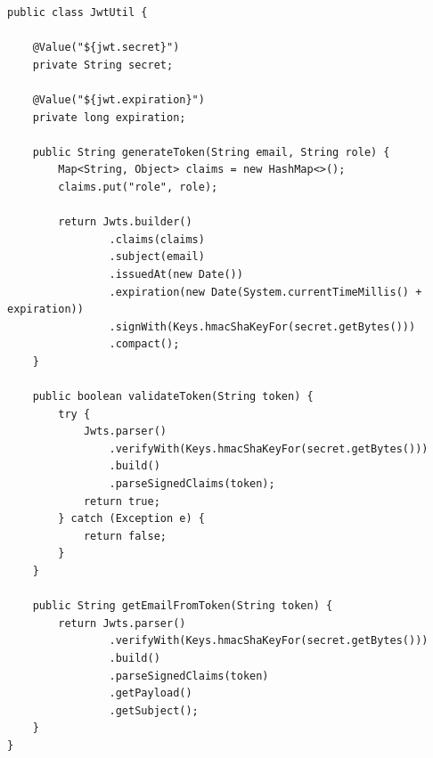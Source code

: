\documentclass[12pt,a4paper,twoside]{book}
\begin{document}
\begin{lstlisting}[style=java]
public class JwtUtil {
    
    @Value("${jwt.secret}")
    private String secret;
    
    @Value("${jwt.expiration}")
    private long expiration;
    
    public String generateToken(String email, String role) {
        Map<String, Object> claims = new HashMap<>();
        claims.put("role", role);
        
        return Jwts.builder()
                .claims(claims)
                .subject(email)
                .issuedAt(new Date())
                .expiration(new Date(System.currentTimeMillis() + expiration))
                .signWith(Keys.hmacShaKeyFor(secret.getBytes()))
                .compact();
    }
    
    public boolean validateToken(String token) {
        try {
            Jwts.parser()
                .verifyWith(Keys.hmacShaKeyFor(secret.getBytes()))
                .build()
                .parseSignedClaims(token);
            return true;
        } catch (Exception e) {
            return false;
        }
    }
    
    public String getEmailFromToken(String token) {
        return Jwts.parser()
                .verifyWith(Keys.hmacShaKeyFor(secret.getBytes()))
                .build()
                .parseSignedClaims(token)
                .getPayload()
                .getSubject();
    }
}
\end{lstlisting}
\end{document}
